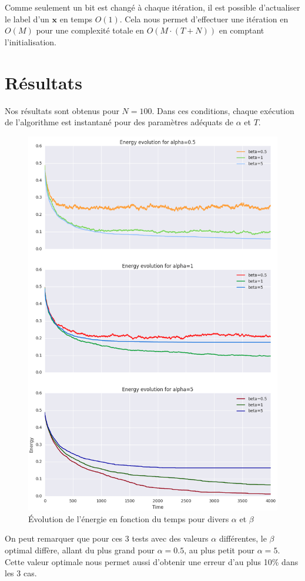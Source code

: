 \documentclass[twocolumn]{article}
\begin{document}
		Comme seulement un bit est changé à chaque itération, il est possible d'actualiser le label d'un $\mathbf{x}$ en temps $O(1)$. Cela nous permet d'effectuer une itération en $O(M)$ pour une complexité totale en $O(M\cdot(T + N))$ en comptant l'initialisation.
		
	\section{Résultats}
		Nos résultats sont obtenus pour $N=100$. Dans ces conditions, chaque exécution de l'algorithme est instantané pour des paramètres adéquats de $\alpha$ et $T$.
		\begin{figure}
			\includegraphics[width=\columnwidth]{../tobekept/ex1_1755923751722050074-r.png}
			\caption{\label{ex1}Évolution de l'énergie en fonction du temps pour divers $\alpha$ et $\beta$}
		\end{figure}
		On peut remarquer que pour ces 3 tests avec des valeurs $\alpha$ différentes, le $\beta$ optimal diffère, allant du plus grand pour $\alpha = 0.5$, au plus petit pour $\alpha = 5$.
		Cette valeur optimale nous permet aussi d'obtenir une erreur d'au plus 10\% dans les 3 cas.
		
\end{document}
